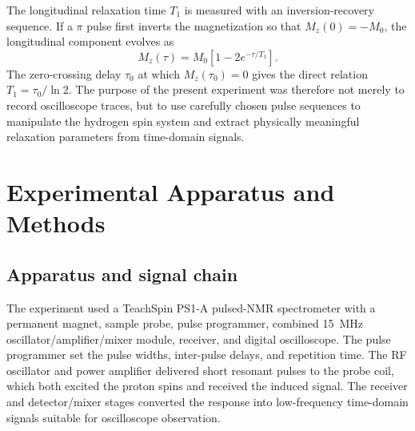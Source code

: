 \documentclass[11pt]{article}
\begin{document}
The longitudinal relaxation time $T_1$ is measured with an inversion-recovery sequence. If a $\pi$ pulse first inverts the magnetization so that $M_z(0)=-M_0$, the longitudinal component evolves as
\[
M_z(\tau)=M_0\left[1-2e^{-\tau/T_1}\right].
\]
The zero-crossing delay $\tau_0$ at which $M_z(\tau_0)=0$ gives the direct relation $T_1=\tau_0/\ln 2$.\cite{uwmanual} The purpose of the present experiment was therefore not merely to record oscilloscope traces, but to use carefully chosen pulse sequences to manipulate the hydrogen spin system and extract physically meaningful relaxation parameters from time-domain signals.

\section{Experimental Apparatus and Methods}

\subsection{Apparatus and signal chain}

The experiment used a TeachSpin PS1-A pulsed-NMR spectrometer with a permanent magnet, sample probe, pulse programmer, combined 15~MHz oscillator/amplifier/mixer module, receiver, and digital oscilloscope.\cite{teachspin} The pulse programmer set the pulse widths, inter-pulse delays, and repetition time. The RF oscillator and power amplifier delivered short resonant pulses to the probe coil, which both excited the proton spins and received the induced signal. The receiver and detector/mixer stages converted the response into low-frequency time-domain signals suitable for oscilloscope observation.
\end{document}
